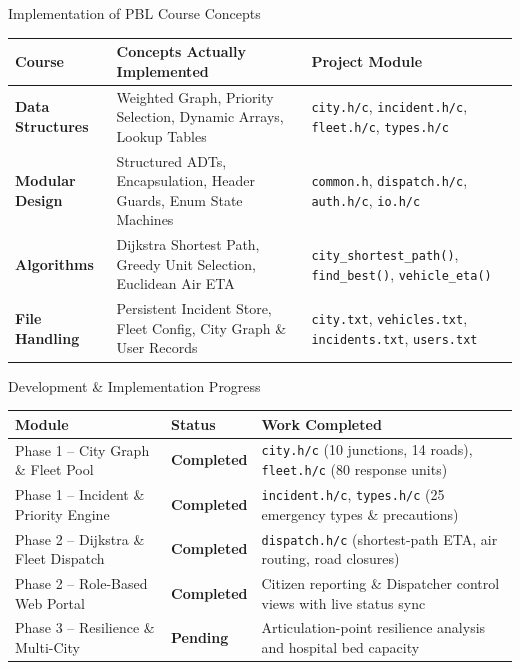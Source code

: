 \documentclass[aspectratio=169,11pt]{beamer}
\begin{document}
\begin{frame}{Implementation of PBL Course Concepts}
\footnotesize
\begin{center}
\renewcommand{\arraystretch}{1.35}
\begin{tabularx}{.96\textwidth}{@{}>{\bfseries}p{3.2cm}X p{4.2cm}@{}}
\toprule
Course & Concepts Actually Implemented & Project Module\\
\midrule
Data Structures & Weighted Graph, Priority Selection, Dynamic Arrays, Lookup Tables & \texttt{city.h/c}, \texttt{incident.h/c}, \texttt{fleet.h/c}, \texttt{types.h/c}\\
Modular Design & Structured ADTs, Encapsulation, Header Guards, Enum State Machines & \texttt{common.h}, \texttt{dispatch.h/c}, \texttt{auth.h/c}, \texttt{io.h/c}\\
\midrule
Algorithms & Dijkstra Shortest Path, Greedy Unit Selection, Euclidean Air ETA & \texttt{city\_shortest\_path()}, \texttt{find\_best()}, \texttt{vehicle\_eta()}\\
File Handling & Persistent Incident Store, Fleet Config, City Graph \& User Records & \texttt{city.txt}, \texttt{vehicles.txt}, \texttt{incidents.txt}, \texttt{users.txt}\\
\bottomrule
\end{tabularx}
\end{center}
\end{frame}

\begin{frame}{Development \& Implementation Progress}
\footnotesize
\begin{center}
\renewcommand{\arraystretch}{1.35}
\begin{tabularx}{.96\textwidth}{@{}p{3.8cm}p{2.0cm}X@{}}
\toprule
\textbf{Module} & \textbf{Status} & \textbf{Work Completed}\\
\midrule
Phase 1 -- City Graph \& Fleet Pool & \textbf{\color{green!50!black}Completed} & \texttt{city.h/c} (10 junctions, 14 roads), \texttt{fleet.h/c} (80 response units)\\
Phase 1 -- Incident \& Priority Engine & \textbf{\color{green!50!black}Completed} & \texttt{incident.h/c}, \texttt{types.h/c} (25 emergency types \& precautions)\\
Phase 2 -- Dijkstra \& Fleet Dispatch & \textbf{\color{green!50!black}Completed} & \texttt{dispatch.h/c} (shortest-path ETA, air routing, road closures)\\
Phase 2 -- Role-Based Web Portal & \textbf{\color{green!50!black}Completed} & Citizen reporting \& Dispatcher control views with live status sync\\
Phase 3 -- Resilience \& Multi-City & \textbf{\color{orange!80!black}Pending} & Articulation-point resilience analysis and hospital bed capacity\\
\bottomrule
\end{tabularx}
\end{center}
\end{frame}
\end{document}
